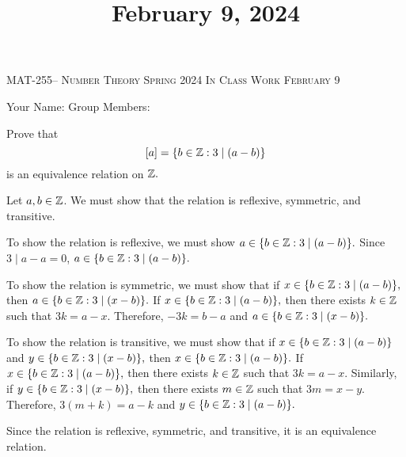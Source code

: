 \documentclass[handout]{ximera}
\title{February 9, 2024}
\begin{document}
\handoutAbstract
\maketitle
  \begin{center}%
    {\large \scshape MAT-255-- Number Theory \hfill Spring 2024 \hfill In Class Work February 9}%
    
    {\large
        Your Name: \hrulefill \quad Group Members:\hrulefill \quad \hrulefill
	\par}%
  \end{center}%


\begin{br}
  Prove that \[[a]=\{b\in\mathbb Z: 3\mid(a-b)\}\] is an equivalence relation on $\mathbb Z.$

    \begin{solution}
        Let $a,b\in\mathbb Z$. We must show that the relation is reflexive, symmetric, and transitive.
  
        To show the relation is reflexive, we must show $a\in \{b\in\mathbb Z: 3\mid(a-b)\}.$ Since $3\mid a-a=0$, $a\in \{b\in\mathbb Z: 3\mid(a-b)\}.$
  
        To show the relation is symmetric, we must show that if $x\in \{b\in\mathbb Z: 3\mid(a-b)\},$ then $a\in \{b\in\mathbb Z: 3\mid(x-b)\}.$ If $x\in \{b\in\mathbb Z: 3\mid(a-b)\},$ then there exists $k\in\mathbb Z$ such that $3k=a-x.$ Therefore, $-3k=b-a$ and $a\in \{b\in\mathbb Z: 3\mid(x-b)\}.$
  
        To show the relation is transitive, we must show that if $x\in \{b\in\mathbb Z: 3\mid(a-b)\}$ and $y\in \{b\in\mathbb Z: 3\mid(x-b)\},$ then $x\in \{b\in\mathbb Z: 3\mid(a-b)\}.$ If $x\in \{b\in\mathbb Z: 3\mid(a-b)\},$ then there exists $k\in\mathbb Z$ such that $3k=a-x.$ 
        Similarly, if $y\in \{b\in\mathbb Z: 3\mid(x-b)\},$ then there exists $m\in\mathbb Z$ such that $3m=x-y.$ Therefore, $3(m+k)=a-k$ and $y\in \{b\in\mathbb Z: 3\mid(a-b)\}.$
        
        Since the relation is reflexive, symmetric, and transitive, it is an equivalence relation.
  \end{solution}
\end{br}


  
\end{document}
